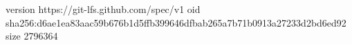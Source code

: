 version https://git-lfs.github.com/spec/v1
oid sha256:d6ae1ea83aac59b676b1d5ffb399646dfbab265a7b71b0913a27233d2bd6ed92
size 2796364
